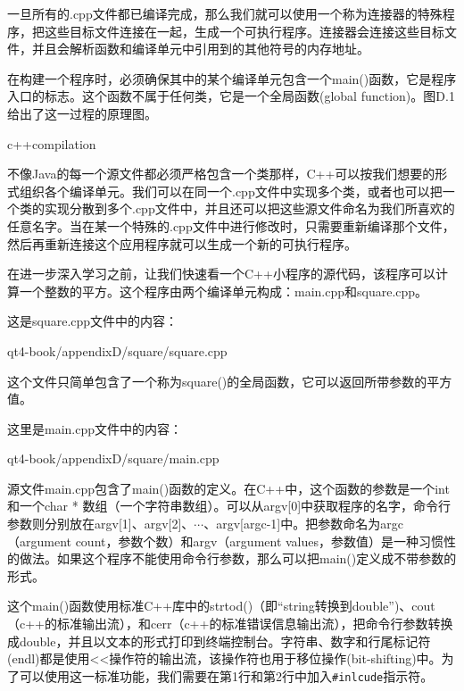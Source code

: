 \documentclass[11pt,oneside]{book}
\begin{document}
\begin{common-format}
一旦所有的.cpp文件都已编译完成，那么我们就可以使用一个称为连接器的特殊程序，把这些目标文件连接在一起，生成一个可执行程序。连接器会连接这些目标文件，并且会解析函数和编译单元中引用到的其他符号的内存地址。

在构建一个程序时，必须确保其中的某个编译单元包含一个main()函数，它是程序入口的标志。这个函数不属于任何类，它是一个全局函数(global function)。图D.1给出了这一过程的原理图。
\begin{fig}[0.8]{c++compilation}
\caption{C++的编译过程（在Windows中）}
\label{fig:c++compilation}
\end{fig}

不像Java的每一个源文件都必须严格包含一个类那样，C++可以按我们想要的形式组织各个编译单元。我们可以在同一个.cpp文件中实现多个类，或者也可以把一个类的实现分散到多个.cpp文件中，并且还可以把这些源文件命名为我们所喜欢的任意名字。当在某一个特殊的.cpp文件中进行修改时，只需要重新编译那个文件，然后再重新连接这个应用程序就可以生成一个新的可执行程序。

在进一步深入学习之前，让我们快速看一个C++小程序的源代码，该程序可以计算一个整数的平方。这个程序由两个编译单元构成：main.cpp和square.cpp。

这是square.cpp文件中的内容：
\begin{cppinput}{qt4-book/appendixD/square/square.cpp}
\end{cppinput}

这个文件只简单包含了一个称为square()的全局函数，它可以返回所带参数的平方值。

这里是main.cpp文件中的内容：
\begin{cppinput}{qt4-book/appendixD/square/main.cpp}
\end{cppinput}

源文件main.cpp包含了main()函数的定义。在C++中，这个函数的参数是一个int和一个char * 数组（一个字符串数组）。可以从argv[0]中获取程序的名字，命令行参数则分别放在argv[1]、argv[2]、$\cdots$、argv[argc-1]中。把参数命名为argc（argument count，参数个数）和argv（argument values，参数值）是一种习惯性的做法。如果这个程序不能使用命令行参数，那么可以把main()定义成不带参数的形式。
 
 这个main()函数使用标准C++库中的strtod()（即“string转换到double”)、cout（c++的标准输出流），和cerr（c++的标准错误信息输出流），把命令行参数转换成double，并且以文本的形式打印到终端控制台。字符串、数字和行尾标记符(endl)都是使用<<操作符的输出流，该操作符也用于移位操作(bit-shifting)中。为了可以使用这一标准功能，我们需要在第1行和第2行中加入\verb+#inlcude+指示符。




\end{common-format}
\end{document}
